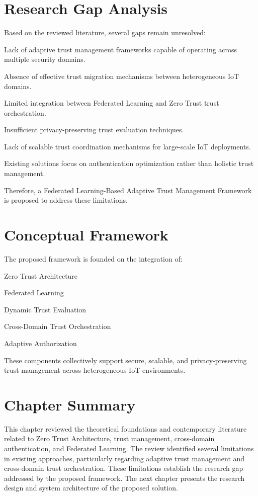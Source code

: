 \section{Research Gap Analysis}

Based on the reviewed literature, several gaps remain unresolved:


Lack of adaptive trust management frameworks capable of operating across multiple security domains.


Absence of effective trust migration mechanisms between heterogeneous IoT domains.


Limited integration between Federated Learning and Zero Trust trust orchestration.


Insufficient privacy-preserving trust evaluation techniques.


Lack of scalable trust coordination mechanisms for large-scale IoT deployments.


Existing solutions focus on authentication optimization rather than holistic trust management.


Therefore, a Federated Learning-Based Adaptive Trust Management Framework is proposed to address these limitations.


\section{Conceptual Framework}

The proposed framework is founded on the integration of:


Zero Trust Architecture


Federated Learning


Dynamic Trust Evaluation


Cross-Domain Trust Orchestration


Adaptive Authorization


These components collectively support secure, scalable, and privacy-preserving trust management across heterogeneous IoT environments.


\section{Chapter Summary}

This chapter reviewed the theoretical foundations and contemporary literature related to Zero Trust Architecture, trust management, cross-domain authentication, and Federated Learning. The review identified several limitations in existing approaches, particularly regarding adaptive trust management and cross-domain trust orchestration. These limitations establish the research gap addressed by the proposed framework. The next chapter presents the research design and system architecture of the proposed solution.
